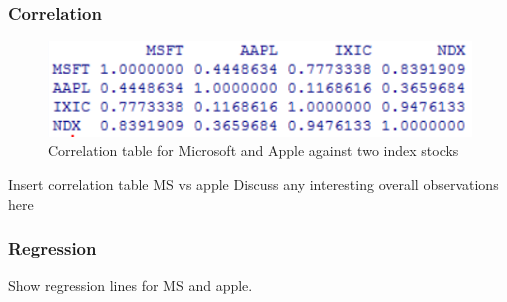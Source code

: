 \documentclass[paper=a4, fontsize=11pt]{scrartcl} %
\numberwithin{equation}{section} %
\numberwithin{figure}{section} %
\numberwithin{table}{section} %
\begin{document}
\subsubsection{Correlation}

\begin{figure}[!htb]
  \includegraphics[width=\linewidth]{graph/cor2.png}
  \caption{Correlation table for Microsoft and Apple against two index stocks}
\endminipage\hfill
\end{figure}

Insert correlation table MS vs apple
Discuss any interesting overall observations here

\subsubsection{Regression}
Show regression lines for MS and apple. 
\end{document}
